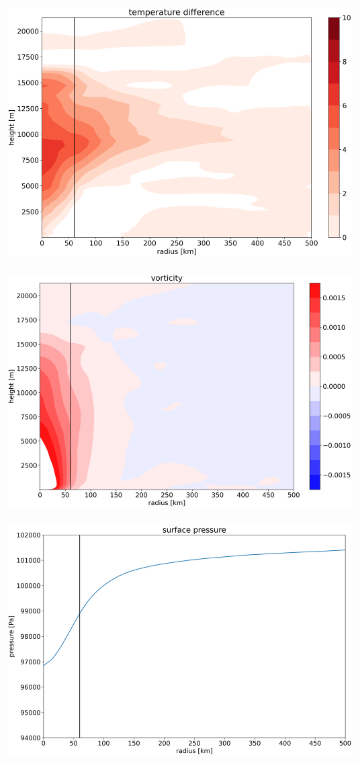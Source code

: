 \begin{figure}[!htb]
\begin{subfigure}{.5\linewidth}
	\end{subfigure}%
	\begin{subfigure}{.5\linewidth}
		\centering
		\includegraphics[width=0.85\linewidth]{img/0299554temp20130905T120000Z_redo.png}
	\end{subfigure}
		\begin{subfigure}{.49\linewidth}
		\centering
		\includegraphics[width=0.85\linewidth]{img/0299554vor20130905T120000Z_redo.png}
	\end{subfigure}
	\begin{subfigure}{.49\linewidth}
		\centering
		\includegraphics[width=0.85\linewidth]{img/0299554pres_msl20130905T120000Z_redo.png}
	\end{subfigure}



\end{figure}
